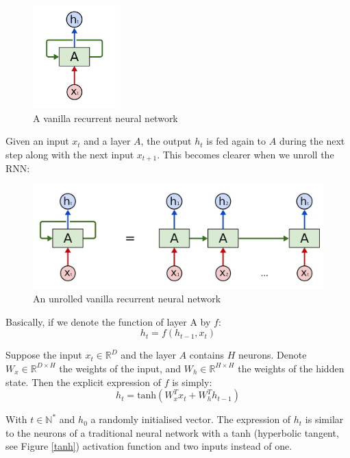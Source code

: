 \begin{figure}[H]
    \centering
    \includegraphics[width=0.3\textwidth]{Images/vanilla-rnn.png}
    \caption{A vanilla recurrent neural network \cite{colah}}
    \label{vanilla-rnn}
\end{figure}

Given an input $x_t$ and a layer $A$, the output $h_t$ is fed again to $A$ during the next step along with the next input $x_{t+1}$. This becomes clearer when we unroll the RNN:

\begin{figure}[H]
    \centering
    \includegraphics[width=\textwidth]{Images/vanilla-rnn2.png}
    \caption{An unrolled vanilla recurrent neural network \cite{colah}}
    \label{unrolled}
\end{figure}

Basically, if we denote the function of layer A by $f$:
\begin{equation}
    h_t = f(h_{t-1}, x_t)
\end{equation}

Suppose the input $x_t \in \mathbb{R}^{D}$ and the layer $A$ contains $H$ neurons. Denote $W_x \in \mathbb{R}^{D\times H}$ the weights of the input, and $W_h \in \mathbb{R}^{H\times H}$ the weights of the hidden state. Then the explicit expression of $f$ is simply:
\begin{equation}
    h_t = \text{tanh}(W_x^T x_t + W_h^T h_{t-1})
\end{equation}

With $t \in \mathbb{N}^*$ and $h_0$ a randomly initialised vector. The expression of $h_t$ is similar to the neurons of a traditional neural network with a tanh (hyperbolic tangent, see Figure \ref{tanh}) activation function and two inputs instead of one.

